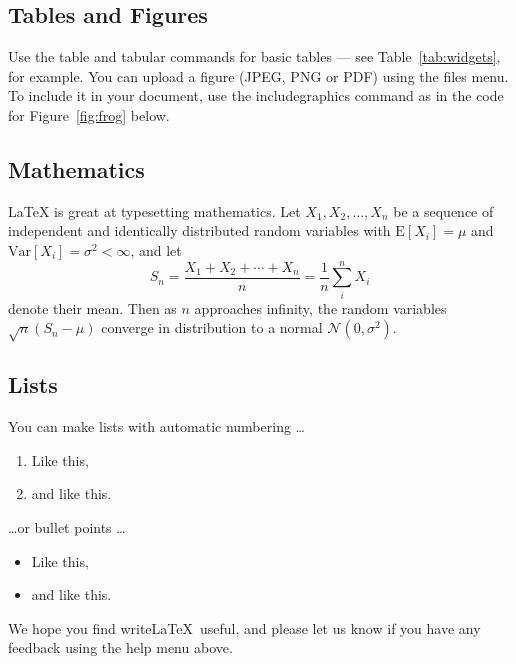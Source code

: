 
\subsection{Tables and Figures}

Use the table and tabular commands for basic tables --- see Table~\ref{tab:widgets}, for example. You can upload a figure (JPEG, PNG or PDF) using the files menu. To include it in your document, use the includegraphics command as in the code for Figure~\ref{fig:frog} below.



\subsection{Mathematics}

\LaTeX{} is great at typesetting mathematics. Let $X_1, X_2, \ldots, X_n$ be a sequence of independent and identically distributed random variables with $\text{E}[X_i] = \mu$ and $\text{Var}[X_i] = \sigma^2 < \infty$, and let
$$S_n = \frac{X_1 + X_2 + \cdots + X_n}{n}
      = \frac{1}{n}\sum_{i}^{n} X_i$$
denote their mean. Then as $n$ approaches infinity, the random variables $\sqrt{n}(S_n - \mu)$ converge in distribution to a normal $\mathcal{N}(0, \sigma^2)$.

\subsection{Lists}

You can make lists with automatic numbering \dots

\begin{enumerate}
\item Like this,
\item and like this.
\end{enumerate}
\dots or bullet points \dots
\begin{itemize}
\item Like this,
\item and like this.
\end{itemize}

We hope you find write\LaTeX\ useful, and please let us know if you have any feedback using the help menu above.

